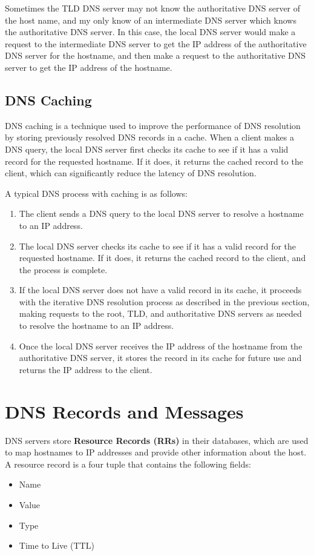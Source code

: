 \documentclass[12pt letter]{report}
\begin{document}
Sometimes the TLD DNS server may not know the authoritative DNS
server of the host name, and my only know of an intermediate DNS
server which knows the authoritative DNS server. In this case, the
local DNS server would make a request to the intermediate DNS server
to get the IP address of the authoritative DNS server for the
hostname, and then make a request to the authoritative DNS server to
get the IP address of the hostname.

\subsection{DNS Caching}

DNS caching is a technique used to improve the performance of DNS
resolution by storing previously resolved DNS records in a cache.
When a client makes a DNS query, the local DNS server first checks
its cache to see if it has a valid record for the requested hostname.
If it does, it returns the cached record to the client, which can
significantly reduce the latency of DNS resolution.

A typical DNS process with caching is as follows:
\begin{enumerate}
  \item The client sends a DNS query to the local DNS server to resolve a
    hostname to an IP address.
  \item The local DNS server checks its cache to see if it has a valid
    record for the requested hostname. If it does, it returns the cached
    record to the client, and the process is complete.
  \item If the local DNS server does not have a valid record in its cache, it
    proceeds with the iterative DNS resolution process as described
    in the previous section, making requests to the root, TLD, and
    authoritative DNS
    servers as needed to resolve the hostname to an IP address.
  \item Once the local DNS server receives the IP address of the
    hostname from the authoritative DNS server, it stores the record
    in its cache for future use and returns the IP address to the client.
\end{enumerate}

\section{DNS Records and Messages}

DNS servers store \textbf{Resource Records (RRs)} in their databases,
which are used to map hostnames to IP addresses and provide other
information about the host. A resource record is a four tuple that
contains the following fields:
\begin{itemize}
  \item Name
  \item Value
  \item Type
  \item Time to Live (TTL)
\end{itemize}
\end{document}
